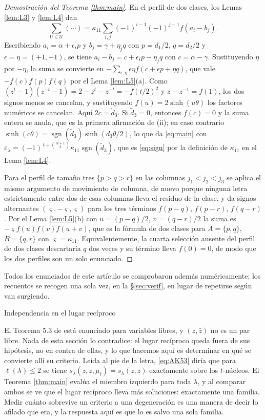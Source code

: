 \documentclass[11pt,reqno]{amsart}
\makeatletter
\renewcommand\section{\@startsection{section}{1}%
  \z@{\linespacing\@plus\linespacing}{.5\linespacing}%
  {\normalfont\large\bfseries\centering}}
\theoremstyle{plain}
\theoremstyle{definition}
\newcommand{\zt}{\mu_t}
\newcommand{\sgn}{\operatorname{sgn}}
\newcommand{\zb}{\bar z}
\makeatother
\begin{document}
\begin{proof}[Demostración del Teorema \ref{thm:main}]
En el perfil de dos clases, los Lemas \ref{lem:L3} y \ref{lem:L4} dan
\[
\sum_{U\in\mathcal U}(\cdots)=\kappa_{11}\sum_{i,j}(-1)^{i-1}(-1)^{j-1}f(a_i-b_j).
\]
Escribiendo $a_i=\alpha+\epsilon_ip$ y $b_j=\gamma+\eta_jq$ con $p=d_1/2$, $q=d_2/2$ y
$\epsilon=\eta=(+1,-1)$, se tiene $a_i-b_j=c+\epsilon_ip-\eta_jq$ con $c=\alpha-\gamma$. Sustituyendo
$\eta$ por $-\eta$, la suma se convierte en
$-\sum_{\epsilon,\eta}\epsilon\eta f(c+\epsilon p+\eta q)$, que vale $-f(c)f(p)f(q)$ por el Lema
\ref{lem:L5}(a). Como $(z^t-1)(z^{-t}-1)=2-z^t-z^{-t}=-f(t/2)^2$ y $z-z^{-1}=f(1)$, los dos signos
menos se cancelan, y sustituyendo $f(u)=2\sinh(u\theta)$ los factores numéricos se cancelan. Aquí
$2c=\tilde d_3$. Si $\tilde d_3=0$, entonces $f(c)=0$ y la suma entera se anula, que es la primera
afirmación de {\rm(ii)}; en caso contrario
$\sinh(c\theta)=\sgn(\tilde d_3)\sinh(d_3\theta/2)$, lo que da \eqref{eq:main} con
$\varepsilon_\lambda=(-1)^{\,t+\binom{N+1}{2}}\kappa_{11}\sgn(\tilde d_3)$, que es
\eqref{eq:sign} por la definición de $\kappa_{11}$ en el Lema \ref{lem:L4}.

Para el perfil de tamaño tres $\{p>q>r\}$ en las columnas $j_1<j_2<j_3$ se aplica el mismo argumento
de movimiento de columna, de nuevo porque ninguna letra estrictamente entre dos de esas columnas
lleva el residuo de la clase, y da signos alternantes $(\varsigma,-\varsigma,\varsigma)$ para los
tres términos $f(p-q)$, $f(p-r)$, $f(q-r)$. Por el Lema \ref{lem:L5}(b) con $u=(p-q)/2$,
$v=(q-r)/2$ la suma es $-\varsigma f(u)f(v)f(u+v)$, que es la fórmula de dos clases para $A=\{p,q\}$,
$B=\{q,r\}$ con $\varsigma=\kappa_{11}$. Equivalentemente, la cuarta selección ausente del perfil de
dos clases descartaría $q$ dos veces y su término lleva $f(0)=0$, de modo que los dos perfiles son un
solo enunciado.
\end{proof}

Todos los enunciados de este artículo se comprobaron además numéricamente; los recuentos se recogen
una sola vez, en la \S\ref{sec:verif}, en lugar de repetirse según van surgiendo.

\section{Independencia en el lugar recíproco}\label{sec:independence}

El Teorema 5.3 de \cite{AK25} está enunciado para variables libres, y $(z,\zb)$ no es un par libre.
Nada de esta sección lo contradice: el lugar recíproco queda fuera de sus hipótesis, no en contra de
ellas, y lo que hacemos aquí es determinar en qué se convierte allí su criterio. Leída al pie de la
letra, \eqref{eq:AK53} diría que para $\ell(\lambda)\le2$ se tiene
$s_\lambda(z,\zb,\zt)=s_\lambda(z,\zb)$ exactamente sobre los $t$-núcleos. El Teorema
\ref{thm:main} evalúa el miembro izquierdo para toda $\lambda$, y al comparar ambos se ve que el
lugar recíproco lleva más soluciones: exactamente una familia. Medir cuánto sobrevive un criterio a
una degeneración es una manera de decir lo afilado que era, y la respuesta aquí es que lo es salvo
una sola familia.
\end{document}
